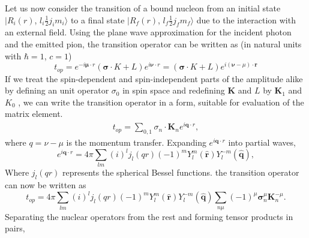 Let us now consider the transition of a bound nucleon from an initial state $|R_i (r)$, $l_i \frac{1}{2} j_i m_i \rangle$ to a final state $|R_f (r)$, $l_f \frac{1}{2} j_f m_f \rangle$ due to the interaction with an external field. Using the plane wave approximation for the incident photon and the emitted pion, the transition operator can be written as (in natural units with $\hbar =1$, $c=1$)
\setcounter{equation}{36}
\begin{equation}
  t_{op}= e^{-i {\boldsymbol  \mu \cdot r}} ({\boldsymbol  \sigma \cdot K} + L)e^{i {\boldsymbol  \nu \cdot r}}= ({\boldsymbol  \sigma \cdot K}+ L) e^{i ({\boldsymbol  \nu - \mu})\cdot {\boldsymbol  r}} \label{chap3-eq37}
\end{equation}
If we treat the spin-dependent and spin-independent parts of the amplitude alike by defining an unit operator $\sigma_0$ in spin space and redefining ${\boldsymbol  K}$ and $L$ by ${\boldsymbol  K_1}$ and $K_0$ , we can write the transition operator in a form, suitable for evaluation of the matrix element.
\begin{align}
  t_{op} = \sum_{0, 1} \sigma_n \cdot {\boldsymbol  K}_n e^{i{\boldsymbol  q \cdot r}}, \label{chap3-eq38}
\end{align}
where $q= \nu- \mu$ is the momentum transfer. Expanding $e^{i {\boldsymbol  q \cdot r}}$ into partial waves,
\begin{equation}
  e^{i {\boldsymbol  q \cdot r}} = 4 \pi \sum_{lm} (i)^l j_l (qr) (-1)^{m}Y_l^m (\hat{{\boldsymbol  r}}) Y_l^{-m} (\hat{{\boldsymbol  q}}), \label{chap3-eq39}
\end{equation}
Where $j_l (qr)$ represents the spherical Bessel functions. the transition operator can now be written as
\begin{equation}
 t_{op}= 4 \pi \sum_{lm} (i)^l j_l (qr) (-1)^m Y_l^m (\hat{{\boldsymbol  r}}) Y_l^{-m} (\hat{{\boldsymbol  q}}) \sum_{n\mu} (-1)^\mu {\boldsymbol \sigma}_n^\mu {\boldsymbol K}_n^{-\mu}. \label{chap3-eq40}
\end{equation}
Separating the nuclear operators from the rest and forming tensor products in pairs,
